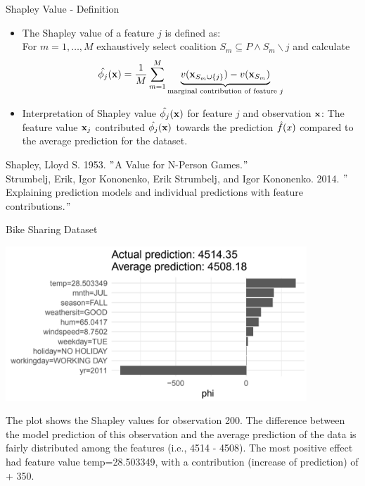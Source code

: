 \documentclass[11pt,compress,t,notes=noshow, aspectratio=169, xcolor=table]{beamer}
\begin{document}
\begin{vbframe}{Shapley Value - Definition}
\begin{itemize}
  \item The Shapley value of a feature $j$ is defined as:\\
  For $m = 1, \dots, M$ exhaustively select coalition $S_m \subseteq P \land S_m \backslash j$  and calculate
$$ \hat{\phi_{j}}(\xv) = \frac{1}{M} \sum_{m=1}^{M} \underbrace{v(\xv_{S_m \cup \{j \} }) - v(\xv_{S_m})}_{\text{marginal contribution of feature $j$}} $$
\lz
  \item Interpretation of Shapley value $\hat{\phi_{j}}(\xv)$ for feature $j$ and observation $\xv$:
  The feature value $\xv_{j}$ contributed $\hat{\phi_{j}}(\xv)$ towards the prediction $\fh(x)$ compared to the average prediction for the dataset.
\end{itemize}
\lz
\tiny
Shapley, Lloyd S. 1953. $"$A Value for N-Person Games.$"$\\
\vspace{0.2cm}
Strumbelj, Erik, Igor Kononenko, Erik Strumbelj, and Igor Kononenko. 2014. $"$Explaining prediction models and individual predictions with feature contributions.$"$

\end{vbframe}

\begin{vbframe}{Bike Sharing Dataset}

\begin{center}
\includegraphics[width=0.85\textwidth]{figure_man/bike-sharing03.png}
\end{center}

The plot shows the Shapley values for observation 200.
The difference between the model prediction of this observation and the average prediction of the data is fairly distributed among the features (i.e., 4514 - 4508).
The most positive effect had feature value temp=28.503349, with a contribution (increase of prediction) of + 350.
\end{vbframe}


\endlecture
\end{document}
